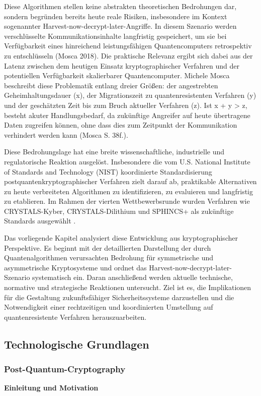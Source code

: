 Diese Algorithmen stellen keine abstrakten theoretischen Bedrohungen dar, sondern begründen bereits heute reale Risiken, insbesondere im Kontext sogenannter Harvest-now-decrypt-later-Angriffe. In diesem Szenario werden verschlüsselte Kommunikationsinhalte langfristig gespeichert, um sie bei Verfügbarkeit eines hinreichend leistungsfähigen Quantencomputers retrospektiv zu entschlüsseln (Mosca 2018). Die praktische Relevanz ergibt sich dabei aus der Latenz zwischen dem heutigen Einsatz kryptographischer Verfahren und der potentiellen Verfügbarkeit skalierbarer Quantencomputer. Michele Mosca beschreibt diese Problematik entlang dreier Größen: der angestrebten Geheimhaltungsdauer (x), der Migrationszeit zu quantenresistenten Verfahren (y) und der geschätzten Zeit bis zum Bruch aktueller Verfahren (z). Ist x + y > z, besteht akuter Handlungsbedarf, da zukünftige Angreifer auf heute übertragene Daten zugreifen können, ohne dass dies zum Zeitpunkt der Kommunikation verhindert werden kann (Mosca S. 38f.).

Diese Bedrohungslage hat eine breite wissenschaftliche, industrielle und regulatorische Reaktion ausgelöst. Insbesondere die vom U.S. National Institute of Standards and Technology (NIST) koordinierte Standardisierung postquantenkryptographischer Verfahren zielt darauf ab, praktikable Alternativen zu heute verbreiteten Algorithmen zu identifizieren, zu evaluieren und langfristig zu etablieren. Im Rahmen der vierten Wettbewerbsrunde wurden Verfahren wie CRYSTALS-Kyber, CRYSTALS-Dilithium und SPHINCS+ als zukünftige Standards ausgewählt \cite{alagic_status_2025}.

Das vorliegende Kapitel analysiert diese Entwicklung aus kryptographischer Perspektive. Es beginnt mit der detaillierten Darstellung der durch Quantenalgorithmen verursachten Bedrohung für symmetrische und asymmetrische Kryptosysteme und ordnet das Harvest-now-decrypt-later-Szenario systematisch ein. Daran anschließend werden aktuelle technische, normative und strategische Reaktionen untersucht. Ziel ist es, die Implikationen für die Gestaltung zukunftsfähiger Sicherheitssysteme darzustellen und die Notwendigkeit einer rechtzeitigen und koordinierten Umstellung auf quantenresistente Verfahren herauszuarbeiten.

\subsection{Technologische Grundlagen}
\subsubsection{Post-Quantum-Cryptography}
\noindent\textbf{Einleitung und Motivation}

